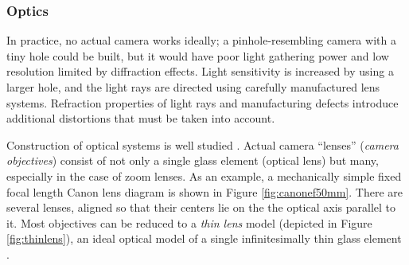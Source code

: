 

\subsubsection{Optics} %

In practice, no actual camera works ideally; a pinhole-resembling camera with a tiny hole could be built, but it would have poor light gathering power and low resolution limited by diffraction effects. \cite{greenleaf1950photographic}
Light sensitivity is increased by using a larger hole, and the light rays are directed using carefully manufactured lens systems.
Refraction properties of light rays and manufacturing defects introduce additional distortions that must be taken into account.

Construction of optical systems is well studied \cite{kingslake1989history,greenleaf1950photographic}.
Actual camera ``lenses'' (\emph{camera objectives}) consist of not only a single glass element (optical lens) but many, especially in the case of zoom lenses.
As an example, a mechanically simple fixed focal length Canon lens diagram is shown in Figure \ref{fig:canonef50mm}.
There are several lenses, aligned so that their centers lie on the the optical axis parallel to it.
Most objectives can be reduced to a \emph{thin lens} model (depicted in Figure \ref{fig:thinlens}), an ideal optical model of a single infinitesimally thin glass element \cite{greenleaf1950photographic,szeliski10vision}.




